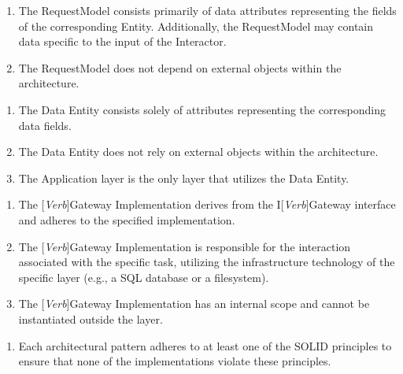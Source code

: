 \begin{enumerate}[label=\themycounter.\arabic*]
    \item The RequestModel consists primarily of data attributes representing the fields
    of the corresponding Entity. Additionally, the RequestModel may contain data specific
    to the input of the Interactor.
    \item The RequestModel does not depend on external objects within the architecture.
\end{enumerate}

\begin{enumerate}[label=\themycounter.\arabic*]
    \item The Data Entity consists solely of attributes representing the corresponding
    data fields.
    \item The Data Entity does not rely on external objects within the architecture.
    \item The Application layer is the only layer that utilizes the Data Entity.
\end{enumerate}

\begin{enumerate}[label=\themycounter.\arabic*]
    \item The [\textit{Verb}]Gateway Implementation derives from the
    I[\textit{Verb}]Gateway interface and adheres to the specified implementation.
    \item The [\textit{Verb}]Gateway Implementation is responsible for the interaction
    associated with the specific task, utilizing the infrastructure technology of the
    specific layer (e.g., a SQL database or a filesystem).
    \item The [\textit{Verb}]Gateway Implementation has an internal scope and cannot be
    instantiated outside the layer.
\end{enumerate}

\begin{enumerate}[label=\themycounter.\arabic*]
    \item Each architectural pattern adheres to at least one of the SOLID principles to
    ensure that none of the implementations violate these principles.
\end{enumerate}
